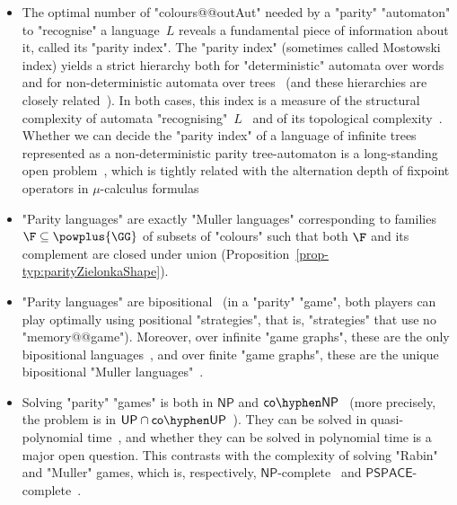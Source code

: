 \documentclass[10pt,a4paper]{amsart}
\newcommand{\NP}{\ensuremath{\mathsf{NP}}}
\newcommand{\coNP}{\ensuremath{\mathsf{co}\hyphen\mathsf{NP}}}
\newcommand{\PSPACE}{\ensuremath{\mathsf{PSPACE}}}
\begin{document}
\begin{itemize}
	\item The optimal number of "colours@@outAut" needed by a "parity" "automaton"  to "recognise" a language~$L$ reveals a fundamental piece of information about it, called its "parity index". 
	The "parity index" (sometimes called Mostowski index) yields a strict hierarchy both for "deterministic" automata over words and for non-deterministic automata over trees~\cite{Niwinski86Clones,Bradfield98MuHierarchy} (and these hierarchies are closely related~\cite{KSV96Relating,NiwinskiWalukievicz1998Relating}).
	In both cases, this index is a measure of the structural complexity of automata "recognising"~$L$~\cite{Wagner1979omega,NiwinskiWalukievicz1998Relating} and of its topological complexity~\cite{ADMN08Topological, Skrzypczak13Topological}.
	Whether we can decide the "parity index" of a language of infinite trees represented as a non-deterministic parity tree-automaton is a long-standing open problem~\cite{NW05DecidingHierarchy,CL08MostwHierarchy}, which is tightly related with the alternation depth of fixpoint operators in $\mu$-calculus formulas~\cite{Niwinski86Clones}
	
	\item "Parity languages" are exactly "Muller languages" corresponding to families $\F\subseteq \powplus{\GG}$ of subsets of "colours" such that both $\F$ and its complement are closed under union (Proposition~\ref{prop-typ:parityZielonkaShape}).
	\item "Parity languages" are bipositional~\cite{EmersonJutla91Determinacy} (in a "parity" "game", both players can play optimally using positional "strategies", that is, "strategies" that use no "memory@@game"). Moreover, over infinite "game graphs", these are the only bipositional languages~\cite{CN06}, and over finite "game graphs", these are the unique bipositional "Muller languages"~\cite{Zielonka1998infinite}.
	\item Solving "parity" "games" is both in $\NP$ and $\coNP$~\cite{EJS93ModelChecking} (more precisely, the problem is in $\mathsf{UP}\cap\mathsf{co\hyphen UP}$~\cite{Jurdzinski98UP}). They can be solved in quasi-polynomial time~\cite{CJKLS17}, and whether they can be solved in polynomial time is a major open question. This contrasts with the complexity of solving "Rabin" and "Muller" games, which is, respectively, $\NP$-complete~\cite{EmersonJutla99Complexity} and $\PSPACE$-complete~\cite{Dawar2005ComplexityBounds}.
\end{itemize}
\end{document}
